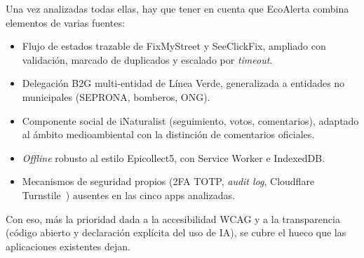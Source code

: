 Una vez analizadas todas ellas, hay que tener en cuenta que EcoAlerta combina elementos de varias fuentes:

\begin{itemize}
  \item Flujo de estados trazable de FixMyStreet y SeeClickFix, ampliado con validación, marcado de duplicados y escalado por \textit{timeout}.
  \item Delegación B2G multi-entidad de Línea Verde, generalizada a entidades no municipales (SEPRONA, bomberos, ONG).
  \item Componente social de iNaturalist (seguimiento, votos, comentarios), adaptado al ámbito medioambiental con la distinción de comentarios oficiales.
  \item \textit{Offline} robusto al estilo Epicollect5, con Service Worker e IndexedDB.
  \item Mecanismos de seguridad propios (2FA TOTP, \textit{audit log}, Cloudflare Turnstile~\parencite{turnstile}) ausentes en las cinco apps analizadas.
\end{itemize}

Con eso, más la prioridad dada a la accesibilidad WCAG y a la transparencia (código abierto y declaración explícita del uso de IA), se cubre el hueco que las aplicaciones existentes dejan.
